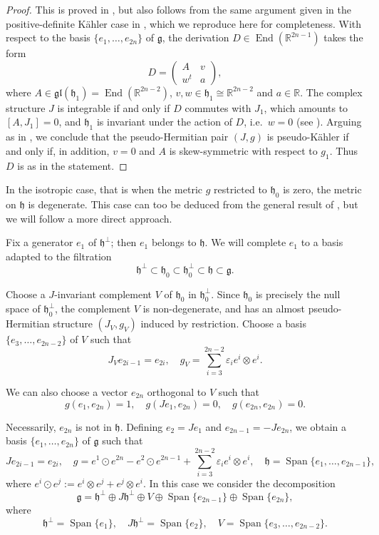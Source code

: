 \documentclass{article}
\theoremstyle{definition}
\DeclareMathOperator{\End}{End}
\newcommand{\R}{\mathbb{R}}
\newcommand{\frg}{\mathfrak{g}}
\newcommand{\frh}{\mathfrak{h}}
\newcommand{\Span}[1]{\operatorname{Span}\{#1\}}
\newcommand{\lie}[1]{\mathfrak{#1}}
\begin{document}
\begin{proof}
    This is proved in \cite[Example 2.45]{Freibert24_TFHS}, but also follows from the same argument given in the positive-definite Kähler case in \cite{FP21}, which we reproduce here for completeness. With respect to the basis $\{e_1,\dotsc, e_{2n}\}$ of $\frg$, the derivation $D\in\End(\R^{2n-1})$ takes the form $$D=\begin{pmatrix}
        A&v\\
        w^t&a
    \end{pmatrix},$$ where $A\in\mathfrak{gl}(\frh_1)=\End(\R^{2n-2})$, $v,w\in\frh_1\cong\R^{2n-2}$ and $a\in\R$. The complex structure $J$ is integrable if and only if $D$ commutes with $J_1$, which amounts to $[A,J_1]=0$, and $\frh_1$ is invariant under the action of $D$, i.e.\ $w=0$ (see \cite{LRv15}). Arguing as in \cite{FP21}, we conclude that the pseudo-Hermitian pair $(J,g)$ is pseudo-Kähler if and only if, in addition, $v=0$ and $A$ is skew-symmetric with respect to $g_1$. Thus $D$ is as in the statement.
\end{proof}

In the isotropic case, that is when the metric $g$ restricted to $\frh_0$ is zero, the metric on $\lie h$ is degenerate. This case can too be deduced from the general result of \cite[Theorem 2.43]{Freibert24_TFHS}, but we will follow a more direct approach.\medskip

Fix a generator $e_1$ of $\lie h^\perp$; then $e_1$ belongs to $\lie h$. We will complete $e_1$ to a basis adapted to the filtration $$\lie h^\perp\subset \lie h_0\subset \lie h_0^\perp\subset\frh\subset\lie g.$$

Choose a $J$-invariant complement $V$ of $\lie h_0$ in $\lie h_0^\perp$. Since $\lie h_0$ is precisely the null space of $\lie h_0^\perp$, the complement $V$ is non-degenerate, and has an almost pseudo-Hermitian structure $(J_V,g_V)$ induced by restriction. Choose a basis $\{e_3,\dotsc, e_{2n-2}\}$ of $V$ such that $$J_Ve_{2i-1}=e_{2i}, \quad g_V=\sum_{i=3}^{2n-2}\varepsilon_i e^i\otimes e^i.$$

We can also choose a vector $e_{2n}$ orthogonal to $V$ such that $$g(e_1,e_{2n})=1,\quad g(Je_1,e_{2n})=0,\quad g(e_{2n},e_{2n})=0.$$

Necessarily, $e_{2n}$ is not in $\lie h$. Defining $e_2=Je_1$ and $e_{2n-1}=-Je_{2n}$, we obtain a basis $\{e_1,\dotsc, e_{2n}\}$ of $\frg$ such that \begin{equation}\label{eqn:almosthermitianstructurezero}
    Je_{2i-1}=e_{2i}, \quad g=e^1\odot e^{2n}-e^2\odot e^{2n-1}+\sum_{i=3}^{2n-2}\varepsilon_i e^i\otimes e^i, \quad \lie h=\Span{e_1,\dotsc, e_{2n-1}},
\end{equation} where $e^i\odot e^j:=e^i\otimes e^j+e^j\otimes e^i$. In this case we consider the decomposition $$\frg=\frh^\perp\oplus J\frh^\perp\oplus V\oplus\Span{e_{2n-1}}\oplus\Span{e_{2n}},$$ where $$\frh^\perp=\Span{e_1},\quad J\frh^\perp=\Span{e_2},\quad V=\Span{e_3,\ldots,e_{2n-2}}.$$
\end{document}
